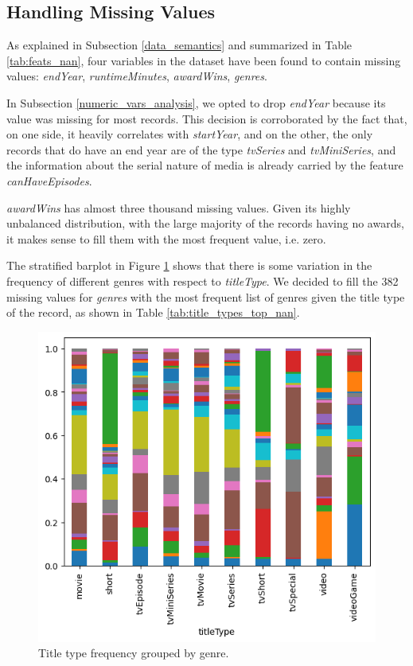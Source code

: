 \subsection{Handling Missing Values}
As explained in Subsection \ref{data_semantics} and summarized in Table \ref{tab:feats_nan}, four variables in the dataset have been found to contain missing values: \textit{endYear}, \textit{runtimeMinutes}, \textit{awardWins}, \textit{genres}.

In Subsection \ref{numeric_vars_analysis}, we opted to drop \textit{endYear} because its value was missing for most records. This decision is corroborated by the fact that, on one side, it heavily correlates with \textit{startYear}, and on the other, the only records that do have an end year are of the type \textit{tvSeries} and \textit{tvMiniSeries}, and the information about the serial nature of media is already carried by the feature \textit{canHaveEpisodes}.

\textit{awardWins} has almost three thousand missing values. Given its highly unbalanced distribution, with the large majority of the records having no awards, it makes sense to fill them with the most frequent value, i.e. zero.

The stratified barplot in Figure \ref{fig:stratified_barplot_genres_titleTypes.png} shows that there is some variation in the frequency of different genres with respect to \textit{titleType}. We decided to fill the 382 missing values for \textit{genres} with the most frequent list of genres given the title type of the record, as shown in Table \ref{tab:title_types_top_nan}.

\begin{figure}
    \includegraphics[width=\columnwidth]{../../results/images/stratified_barplot_genres_titleTypes.png}
    \caption{Title type frequency grouped by genre.}
    \label{fig:stratified_barplot_genres_titleTypes.png}
\end{figure}

